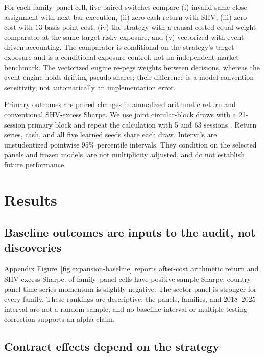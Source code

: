 \documentclass{article}
\begin{document}
For each family--panel cell, five paired switches compare (i) invalid
same-close assignment with next-bar execution, (ii) zero cash return with SHV,
(iii) zero cost with 13-basis-point cost, (iv) the strategy with a causal costed
equal-weight comparator at the same target risky exposure, and (v) vectorized
with event-driven accounting. The comparator is conditional on the strategy's
target exposure and is a conditional exposure control, not an independent market
benchmark. The vectorized engine re-pegs weights between decisions, whereas the
event engine holds drifting pseudo-shares; their difference is a model-convention
sensitivity, not automatically an implementation error.

Primary outcomes are paired changes in annualized arithmetic return and
conventional SHV-excess Sharpe. We use \ExpansionBootstrapReplications{} joint
circular-block draws with a 21-session primary block and repeat the calculation
with 5 and 63 sessions \citep{politis1992circular}. Return series, cash, and all
five learned seeds share each draw. Intervals are unstudentized pointwise 95\%
percentile intervals. They condition on the selected panels and frozen models,
are not multiplicity adjusted, and do not establish future performance.

\section{Results}

\subsection{Baseline outcomes are inputs to the audit, not discoveries}

Appendix Figure~\ref{fig:expansion-baseline} reports after-cost arithmetic return and
SHV-excess Sharpe. \ExpansionPositiveBaselineSharpeCount{} of
\ExpansionFamilyPanelCount{} family--panel cells have positive sample
Sharpe; country-panel time-series momentum is slightly negative. The sector
panel is stronger for every family. These rankings are descriptive: the panels,
families, and 2018--2025 interval are not a random sample, and no baseline
interval or multiple-testing correction supports an alpha claim.

\subsection{Contract effects depend on the strategy}
\end{document}
